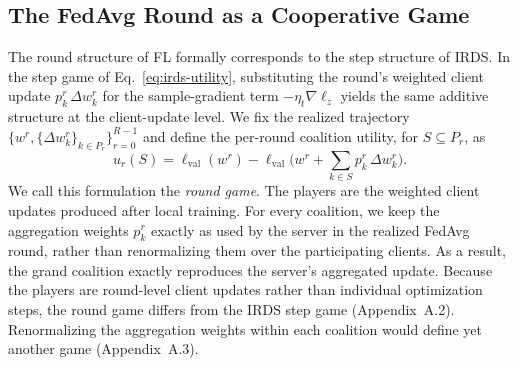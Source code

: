 \documentclass[letterpaper]{article} %
\theoremstyle{definition} %
\newcommand{\lval}{\ell_{\mathrm{val}}} %
\newcommand{\djh}[1]{{\leavevmode\color{magenta}[DJ: #1]}}
\begin{document}

\subsection{The FedAvg Round as a Cooperative Game}
\label{sec:game}

The round structure of FL formally corresponds to the step structure of IRDS.
In the step game of Eq.~\eqref{eq:irds-utility}, substituting the round's
weighted client update $p_k^r\,\Delta w_k^r$ for the sample-gradient term
$-\eta_t \nabla\ell_z$ yields the same additive structure at the client-update
level. We fix the realized trajectory
$\{w^r, \{\Delta w_k^r\}_{k \in P_r}\}_{r=0}^{R-1}$ and define the per-round
coalition utility, for $S \subseteq P_r$, as
\begin{equation}\label{eq:round-utility}
u_r(S) = \lval(w^r)
- \lval\Big(w^r + \textstyle\sum_{k \in S} p_k^r\, \Delta w_k^r\Big).
\end{equation}
We call this formulation the \emph{round game}. The players are the weighted
client updates produced after local training. For every coalition, we keep the
aggregation weights $p_k^r$ exactly as used by the server in the realized
FedAvg round, rather than renormalizing them over the participating clients.
As a result, the grand coalition exactly reproduces the server's aggregated
update. Because the players are round-level client updates rather than
individual optimization steps, the round game differs from the IRDS step game
(Appendix~A.2). Renormalizing the aggregation weights within each coalition
would define yet another game (Appendix~A.3).
\end{document}
